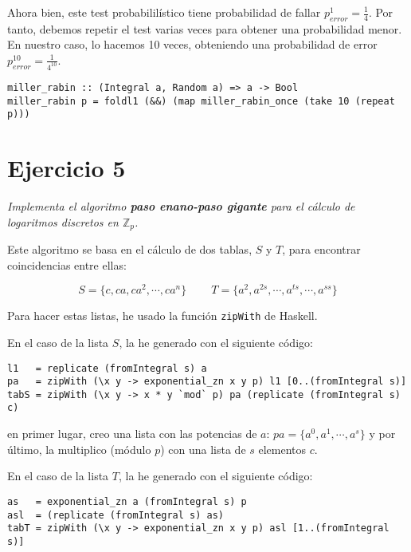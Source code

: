 \documentclass[10pt,spanish]{article}
\begin{document}
Ahora bien, este test probabililístico tiene probabilidad de fallar $p_{error}^1 = \frac{1}{4}$. Por tanto, debemos repetir el test varias veces para obtener una probabilidad menor. En nuestro caso, lo hacemos 10 veces, obteniendo una probabilidad de error $p_{error}^{10} = \frac{1}{4^{10}}$.

\begin{verbatim}
miller_rabin :: (Integral a, Random a) => a -> Bool
miller_rabin p = foldl1 (&&) (map miller_rabin_once (take 10 (repeat p))) 
\end{verbatim}

\section{\textcolor{rojo}Ejercicio 5}
\textit{Implementa el algoritmo \textbf{\textcolor{rojo}{paso enano-paso gigante}} para el cálculo de logaritmos discretos en $\mathbb{Z}_p$.}

Este algoritmo se basa en el cálculo de dos tablas, $S$ y $T$, para encontrar coincidencias entre ellas:

\begin{displaymath}
S = \{c, ca, ca^2, \cdots, ca^n\} \qquad\ T = \{a^2, a^{2s}, \cdots, a^{ts}, \cdots, a^{ss}\}
\end{displaymath}

Para hacer estas listas, he usado la función \texttt{zipWith} de Haskell. 

En el caso de la lista $S$, la he generado con el siguiente código:

\begin{verbatim}
l1   = replicate (fromIntegral s) a
pa   = zipWith (\x y -> exponential_zn x y p) l1 [0..(fromIntegral s)]
tabS = zipWith (\x y -> x * y `mod` p) pa (replicate (fromIntegral s) c)
\end{verbatim}

en primer lugar, creo una lista con las potencias de $a$: $pa = \{a^0, a^1, \cdots, a^s\}$ y por último, la multiplico (módulo $p$) con una lista de $s$ elementos $c$.

En el caso de la lista $T$, la he generado con el siguiente código:

\begin{verbatim}
as   = exponential_zn a (fromIntegral s) p
asl  = (replicate (fromIntegral s) as)
tabT = zipWith (\x y -> exponential_zn x y p) asl [1..(fromIntegral s)]
\end{verbatim}
\end{document}
